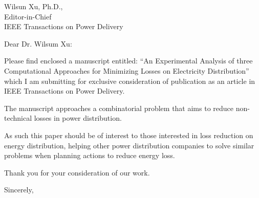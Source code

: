 \documentclass{letter}
\begin{document}
\begin{letter}{
Wilsun Xu, Ph.D.,\\
Editor-in-Chief\\
IEEE Transactions on Power Delivery
}

\opening{Dear Dr. Wilsum Xu:}

Please find enclosed a manuscript entitled:
``An Experimental Analysis of three Computational Approaches for Minimizing Losses on Electricity Distribution''
which I am submitting for exclusive consideration of publication as an article in IEEE Transactions on Power Delivery.

The manuscript approaches a combinatorial problem that aims to reduce
non-technical losses in power distribution.

As such this paper should be of interest to those interested in loss
reduction on energy distribution, helping other power distribution companies to
solve similar problems when planning actions to reduce energy loss.

Thank you for your consideration of our work.

\closing{Sincerely,}


\end{letter}
\end{document}
